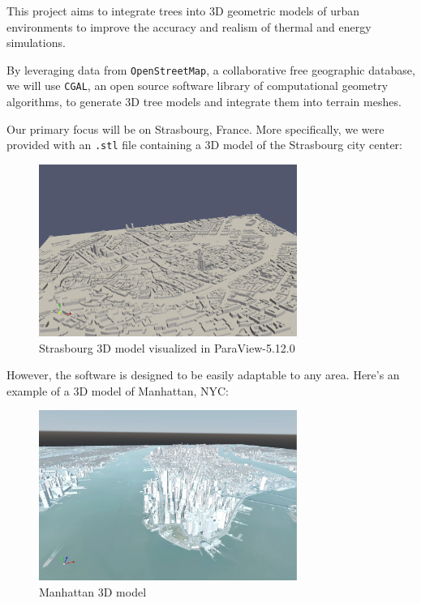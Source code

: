 \documentclass[12pt]{article}
\begin{document}
This project aims to integrate trees into 3D geometric models of urban
environments to improve the accuracy and realism of thermal and energy
simulations.

By leveraging data from \texttt{OpenStreetMap}\cite{openstreetmap}, a
collaborative free geographic database, we will use \texttt{CGAL}\cite{cgal},
an open source software library of computational geometry algorithms,
to generate 3D tree models and integrate them into terrain meshes.

Our primary focus will be on Strasbourg, France. More specifically, we were
provided with an \texttt{.stl}\cite{stl} file containing a 3D model of the
Strasbourg city center:

\begin{figure}[H]
    \centering
    \includegraphics[width=0.75\textwidth]{images/stras_mesh.png}
    \caption{Strasbourg 3D model visualized in ParaView-5.12.0\cite{paraview}}
\end{figure}

However, the software is designed to be easily adaptable to any area.
Here's an example of a 3D model of Manhattan, NYC:

\begin{figure}[H]
    \centering
    \includegraphics[width=0.75\textwidth]{images/manhattan-mesh-1.png}
    \caption{Manhattan 3D model}
\end{figure}
\end{document}
